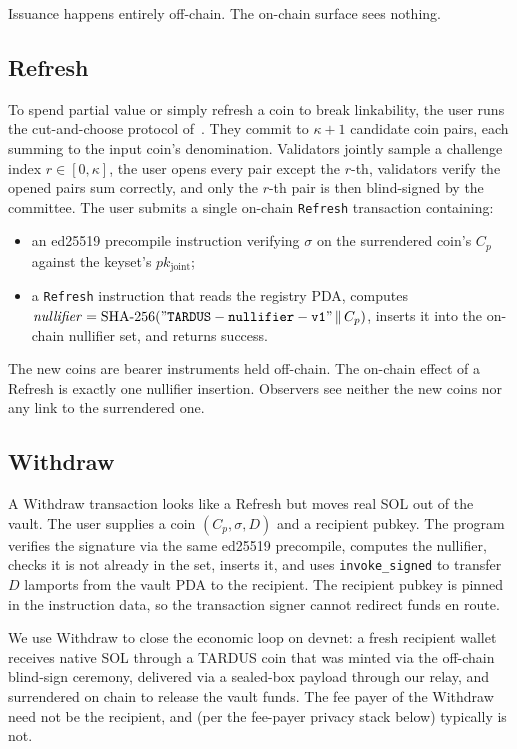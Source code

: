 Issuance happens entirely off-chain. The on-chain surface sees nothing.

\subsection{Refresh}
\label{sec:proto-refresh}

To spend partial value or simply refresh a coin to break linkability, the user runs the cut-and-choose protocol of~\cite{dold2019}. They commit to $\kappa + 1$ candidate coin pairs, each summing to the input coin's denomination. Validators jointly sample a challenge index $r \in [0, \kappa]$, the user opens every pair except the $r$-th, validators verify the opened pairs sum correctly, and only the $r$-th pair is then blind-signed by the committee. The user submits a single on-chain \texttt{Refresh} transaction containing:

\begin{itemize}[leftmargin=2em,itemsep=2pt]
  \item an ed25519 precompile instruction verifying $\sigma$ on the surrendered coin's $C_p$ against the keyset's $pk_{\mathrm{joint}}$;
  \item a \texttt{Refresh} instruction that reads the registry PDA, computes $\mathit{nullifier} = \operatorname{SHA-256}(\mathtt{"TARDUS-nullifier-v1"} \,\|\, C_p)$, inserts it into the on-chain nullifier set, and returns success.
\end{itemize}

The new coins are bearer instruments held off-chain. The on-chain effect of a Refresh is exactly one nullifier insertion. Observers see neither the new coins nor any link to the surrendered one.

\subsection{Withdraw}
\label{sec:proto-withdraw}

A Withdraw transaction looks like a Refresh but moves real SOL out of the vault. The user supplies a coin $(C_p, \sigma, D)$ and a recipient pubkey. The program verifies the signature via the same ed25519 precompile, computes the nullifier, checks it is not already in the set, inserts it, and uses \texttt{invoke\_signed} to transfer $D$ lamports from the vault PDA to the recipient. The recipient pubkey is pinned in the instruction data, so the transaction signer cannot redirect funds en route.

We use Withdraw to close the economic loop on devnet: a fresh recipient wallet receives native SOL through a TARDUS coin that was minted via the off-chain blind-sign ceremony, delivered via a sealed-box payload through our relay, and surrendered on chain to release the vault funds. The fee payer of the Withdraw need not be the recipient, and (per the fee-payer privacy stack below) typically is not.

